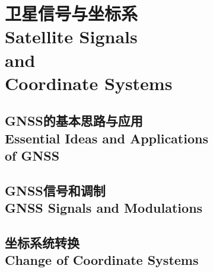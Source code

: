 \documentclass[a4paper,12pt]{book}
\begin{document}
\lstset{
	numbers=left,
	numberstyle=\tiny,
	tabsize=1,
	breaklines=true,
	frame=shadowbox
} %

\part[卫星信号与坐标系统]{卫星信号与坐标系\\Satellite Signals \\and\\ Coordinate Systems}
	\chapter[GNSS的基本思路与应用]{GNSS的基本思路与应用\\Essential Ideas and Applications \\ of GNSS}
	\minitoc %
	\newpage%
		
		
		


	\chapter[GNSS信号和调制]{GNSS信号和调制\\GNSS Signals and Modulations}
	\minitoc %
	\newpage%
		
		
	

	\chapter[坐标系统转换]{坐标系统转换\\Change of Coordinate Systems}
	\minitoc %
	\newpage%
		
		
		
		
		
		
	
\end{document}
